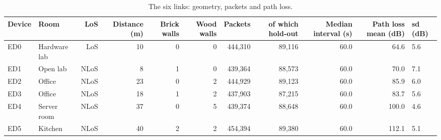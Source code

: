 \begin{table}[t]
\centering
\caption{The six links: geometry, packets and path loss.}
\label{tab:devices}
\begin{tabular}{llrrrrrrrr}
\toprule
Device & Room & LoS & Distance (m) & Brick walls & Wood walls & Packets & of which hold-out & Median interval (s) & Path loss mean (dB) & sd (dB) \\
\midrule
ED0 & Hardware lab & LoS & 10 & 0 & 0 & 444,310 & 89,116 & 60.0 & 64.6 & 5.6 \\
ED1 & Open lab & NLoS & 8 & 1 & 0 & 439,364 & 88,573 & 60.0 & 70.0 & 7.1 \\
ED2 & Office & NLoS & 23 & 0 & 2 & 444,929 & 89,123 & 60.0 & 85.9 & 6.0 \\
ED3 & Office & NLoS & 18 & 1 & 2 & 437,903 & 87,215 & 60.0 & 83.7 & 5.6 \\
ED4 & Server room & NLoS & 37 & 0 & 5 & 439,374 & 88,648 & 60.0 & 100.0 & 4.6 \\
ED5 & Kitchen & NLoS & 40 & 2 & 2 & 454,394 & 89,380 & 60.0 & 112.1 & 5.1 \\
\bottomrule
\end{tabular}
\end{table}

